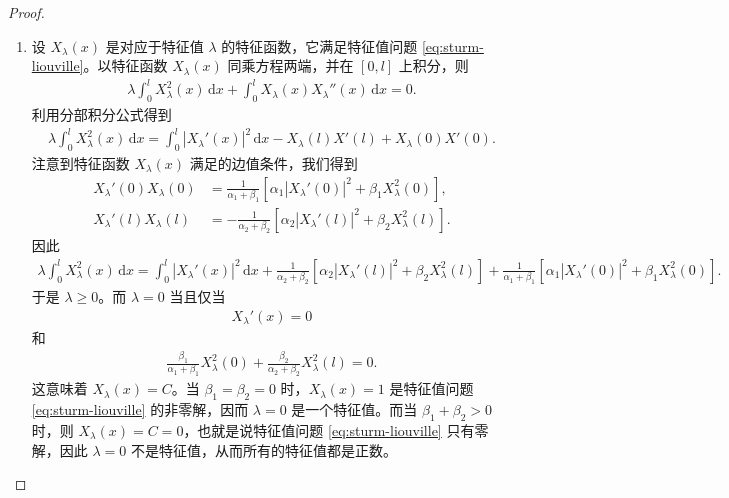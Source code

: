 \documentclass[../../main.tex]{subfiles}%
\begin{document}
\begin{proof}
\begin{enumerate}[(1)]
\item 设 $X_\lambda(x)$ 是对应于特征值 $\lambda$ 的特征函数，它满足特征值问题 \eqref{eq:sturm-liouville}。以特征函数 $X_\lambda(x)$ 同乘方程两端，并在 $[0,l]$ 上积分，则
\begin{align*}
\lambda\int_0^l X_\lambda^2(x)\,\mathrm{d}x+\int_0^l X_\lambda(x)X_\lambda''(x)\,\mathrm{d}x=0.
\end{align*}
利用分部积分公式得到
\begin{align*}
\lambda\int_0^l X_\lambda^2(x)\,\mathrm{d}x=\int_0^l |X_\lambda'(x)|^2\,\mathrm{d}x-X_\lambda(l)X'(l)+X_\lambda(0)X'(0).
\end{align*}
注意到特征函数 $X_\lambda(x)$ 满足的边值条件，我们得到
\begin{align*}
X_\lambda'(0)X_\lambda(0)&=\frac{1}{\alpha_1+\beta_1}[\alpha_1|X_\lambda'(0)|^2+\beta_1X_\lambda^2(0)],\\
X_\lambda'(l)X_\lambda(l)&=-\frac{1}{\alpha_2+\beta_2}[\alpha_2|X_\lambda'(l)|^2+\beta_2X_\lambda^2(l)].
\end{align*}
因此
\begin{align*}
\lambda\int_0^l X_\lambda^2(x)\,\mathrm{d}x
=\int_0^l |X_\lambda'(x)|^2\,\mathrm{d}x
+\frac{1}{\alpha_2+\beta_2}[\alpha_2|X_\lambda'(l)|^2+\beta_2X_\lambda^2(l)]  +\frac{1}{\alpha_1+\beta_1}[\alpha_1|X_\lambda'(0)|^2+\beta_1X_\lambda^2(0)].
\end{align*}
于是 $\lambda\geqslant 0$。而 $\lambda=0$ 当且仅当
\begin{align*}
X_\lambda'(x)=0
\end{align*}
和
\begin{align*}
\frac{\beta_1}{\alpha_1+\beta_1}X_\lambda^2(0)+\frac{\beta_2}{\alpha_2+\beta_2}X_\lambda^2(l)=0.
\end{align*}
这意味着 $X_\lambda(x)=C$。当 $\beta_1=\beta_2=0$ 时，$X_\lambda(x)=1$ 是特征值问题 \eqref{eq:sturm-liouville} 的非零解，因而 $\lambda=0$ 是一个特征值。而当 $\beta_1+\beta_2>0$ 时，则 $X_\lambda(x)=C=0$，也就是说特征值问题 \eqref{eq:sturm-liouville} 只有零解，因此 $\lambda=0$ 不是特征值，从而所有的特征值都是正数。


\end{enumerate}
\end{proof}
\end{document}
